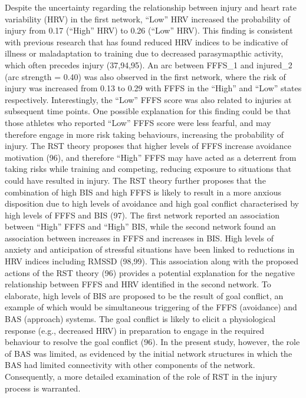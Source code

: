 \documentclass[
  english,
  man]{apa6}
\begin{document}
Despite the uncertainty regarding the relationship between injury and heart rate variability (HRV) in the first network, ``Low'' HRV increased the probability of injury from 0.17 (``High'' HRV) to 0.26 (``Low'' HRV).
This finding is consistent with previous research that has found reduced HRV indices to be indicative of illness or maladaptation to training due to decreased parasymapthic activity, which often precedes injury (37,94,95).
An arc between FFFS\_1 and injured\_2 (arc strength = 0.40) was also observed in the first network, where the risk of injury was increased from 0.13 to 0.29 with FFFS in the ``High'' and ``Low'' states respectively.
Interestingly, the ``Low'' FFFS score was also related to injuries at subsequent time points.
One possible explanation for this finding could be that those athletes who reported ``Low'' FFFS score were less fearful, and may therefore engage in more risk taking behaviours, increasing the probability of injury.
The RST theory proposes that higher levels of FFFS increase avoidance motivation (96), and therefore ``High'' FFFS may have acted as a deterrent from taking risks while training and competing, reducing exposure to situations that could have resulted in injury.
The RST theory further proposes that the combination of high BIS and high FFFS is likely to result in a more anxious disposition due to high levels of avoidance and high goal conflict characterised by high levels of FFFS and BIS (97).
The first network reported an association between ``High'' FFFS and ``High'' BIS, while the second network found an association between increases in FFFS and increases in BIS.
High levels of anxiety and anticipation of stressful situations have been linked to reductions in HRV indices including RMSSD (98,99).
This association along with the proposed actions of the RST theory (96) provides a potential explanation for the negative relationship between FFFS and HRV identified in the second network.
To elaborate, high levels of BIS are proposed to be the result of goal conflict, an example of which would be simultaneous triggering of the FFFS (avoidance) and BAS (approach) systems.
The goal conflict is likely to elicit a physiological response (e.g., decreased HRV) in preparation to engage in the required behaviour to resolve the goal conflict (96).
In the present study, however, the role of BAS was limited, as evidenced by the initial network structures in which the BAS had limited connectivity with other components of the network.
Consequently, a more detailed examination of the role of RST in the injury process is warranted.
\end{document}
